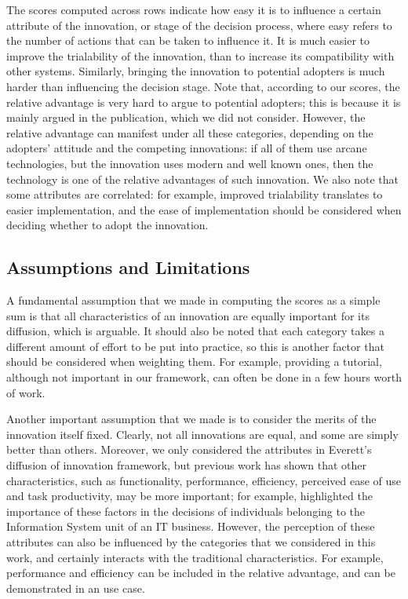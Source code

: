\documentclass[12pt]{article}
\begin{document}
The scores computed across rows indicate how easy it is to influence a certain attribute of the innovation, or stage of the decision process, where easy refers to the number of actions that can be taken to influence it. It is much easier to improve the trialability of the innovation, than to increase its compatibility with other systems. Similarly, bringing the innovation to potential adopters is much harder than influencing the decision stage. Note that, according to our scores, the relative advantage is very hard to argue to potential adopters; this is because it is mainly argued in the publication, which we did not consider. However, the relative advantage can manifest under all these categories, depending on the adopters' attitude and the competing innovations: if all of them use arcane technologies, but the innovation uses modern and well known ones, then the technology is one of the relative advantages of such innovation. We also note that some attributes are correlated: for example, improved trialability translates to easier implementation, and the ease of implementation should be considered when deciding whether to adopt the innovation.

\subsection{Assumptions and Limitations}
\label{sec:orgfea0f21}
A fundamental assumption that we made in computing the scores as a simple sum is that all characteristics of an innovation are equally important for its diffusion, which is arguable. It should also be noted that each category takes a different amount of effort to be put into practice, so this is another factor that should be considered when weighting them. For example, providing a tutorial, although not important in our framework, can often be done in a few hours worth of work.

Another important assumption that we made is to consider the merits of the innovation itself fixed. Clearly, not all innovations are equal, and some are simply better than others. Moreover, we only considered the attributes in Everett's diffusion of innovation framework, but previous work has shown that other characteristics, such as functionality, performance, efficiency, perceived ease of use and task productivity, may be more important; for example, \cite{itlocus} highlighted the importance of these factors in the decisions of individuals belonging to the Information System unit of an IT business. However, the perception of these attributes can also be influenced by the categories that we considered in this work, and certainly interacts with the traditional characteristics. For example, performance and efficiency can be included in the relative advantage, and can be demonstrated in an use case.
\end{document}

